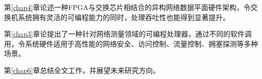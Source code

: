 第\ref{chap4}章论述一种FPGA与交换芯片相结合的异构网络数据平面硬件架构，令交换机系统拥有灵活的可编程能力的同时，处理吞吐性也能得到显著提升。

第\ref{chap3}章论提出了一种针对网络测量领域的可编程处理器，通过不同的软件调用，令系统硬件适用于高性能的网络安全、访问控制、流量控制、拥塞探测等多种场景。

第\ref{chap6}章总结全文工作，并展望未来研究方向。






































